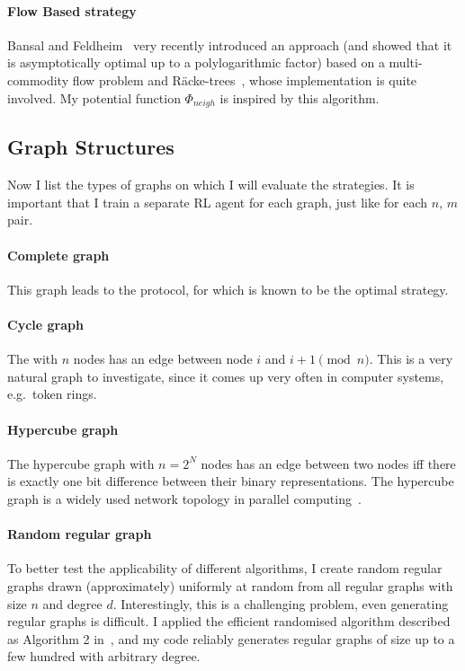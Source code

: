 \paragraph{Flow Based strategy} Bansal and Feldheim~\cite{bansal2021twochoicegraphical} very recently introduced an approach (and showed that it is asymptotically optimal up to a polylogarithmic factor) based on a multi-commodity flow problem and R\"{a}cke-trees~\cite{racke2008racketree}, whose implementation is quite involved. My potential function $\Phi_{neigh}$ is inspired by this algorithm.


\subsection{Graph Structures}


Now I list the types of graphs on which I will evaluate the strategies. It is important that I train a separate RL agent for each graph, just like for each $n$, $m$ pair.


\paragraph{Complete graph} This graph leads to the \TwoChoice protocol, for which \Greedy is known to be the optimal strategy.


\paragraph{Cycle graph} The \CycleGraph with $n$ nodes has an edge between node $i$ and $i+1 \pmod{n}$. This is a very natural graph to investigate, since it comes up very often in computer systems, e.g.\ token rings.


\paragraph{Hypercube graph} The hypercube graph with $n=2^N$ nodes has an edge between two nodes iff there is exactly one bit difference between their binary representations. The hypercube graph is a widely used network topology in parallel computing~\cite{ayalvadi2005hypercubenetwork}.


\paragraph{Random regular graph} To better test the applicability of different algorithms, I create random regular graphs drawn (approximately) uniformly at random from all regular graphs with size $n$ and degree $d$. Interestingly, this is a challenging problem, even generating regular graphs is difficult. I applied the efficient randomised algorithm described as Algorithm 2 in~\cite{steger1999randomregulargraphs}, and my code reliably generates regular graphs of size up to a few hundred with arbitrary degree.

